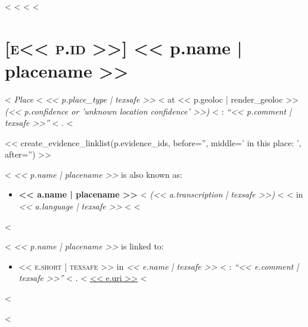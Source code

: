 <%
<%
<%
<%
\section*{\hypertarget{place<<p.id>>}{\textsc{[e<< p.id >>]} << p.name | placename >>}}

<%
  \emph{Place}
<%
  \emph{<< p.place_type | texsafe >>}
<%
at
<< p.geoloc | render_geoloc >>
\emph{(<< p.confidence or 'unknown location confidence' >>)}
<%
: \emph{\enquote{<< p.comment | texsafe >>}}
<%
.
<%


<< create_evidence_linklist(p.evidence_ids, before='', middle=' in this place: ', after='') >>

<%
  \emph{<< p.name | placename >>} is also known as:

  \begin{itemize}
    <%
    \item
      \textbf{<< a.name | placename >>}
      <%
      \emph{(<< a.transcription | texsafe >>)}
      <%
      <%
      in
      \emph{<< a.language | texsafe >>}
      <%
    <%
  \end{itemize}
<%

<%
  \emph{<< p.name | placename >>} is linked to:

  \begin{itemize}
    <%
    \item
      \textsc{<< e.short | texsafe >>} in
      \emph{<< e.name | texsafe >>}
      <%
      : \emph{\enquote{<< e.comment | texsafe >>}}
      <%
      .
      <%
      \url{<< e.uri >>}
    <%
  \end{itemize}
<%

<%
